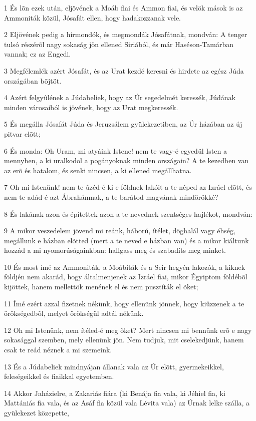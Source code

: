 \par 1 És lõn ezek után, eljövének a Moáb fiai és Ammon fiai, és velök mások is az Ammoniták közül, Jósafát ellen, hogy hadakozzanak vele.
\par 2 Eljövének pedig a hírmondók, és megmondák Jósafátnak, mondván: A tenger tulsó részérõl nagy sokaság jön ellened Siriából, és már Haséson-Tamárban vannak; ez az Engedi.
\par 3 Megfélemlék azért Jósafát, és az Urat kezdé keresni és hirdete az egész Júda országában bõjtöt.
\par 4 Azért felgyûlének a Júdabeliek, hogy az Úr segedelmét keressék, Júdának minden városaiból is jövének, hogy az Urat megkeressék.
\par 5 És megálla Jósafát Júda és Jeruzsálem gyülekezetiben, az Úr házában az új pitvar elõtt;
\par 6 És monda: Oh Uram, mi atyáink Istene! nem te vagy-é egyedül Isten a mennyben, a ki uralkodol a pogányoknak minden országain? A te kezedben van az erõ és hatalom, és senki nincsen, a ki ellened megállhatna.
\par 7 Oh mi Istenünk! nem te ûzéd-é ki e földnek lakóit a te néped az Izráel elõtt, és nem te adád-é azt Ábrahámnak, a te barátod magvának mindörökké?
\par 8 És lakának azon és építettek azon a te nevednek szentséges hajlékot, mondván:
\par 9 A mikor veszedelem jövend mi reánk, háború, ítélet, döghalál vagy éhség, megállunk e házban elõtted (mert a te neved  e házban van) és a mikor kiáltunk hozzád a mi nyomorúságainkban: hallgass meg és szabadíts meg minket.
\par 10 És most ímé az Ammoniták, a Moábiták és a Seir hegyén lakozók, a kiknek földjén nem akarád, hogy általmenjenek az Izráel fiai, mikor Égyiptom földébõl kijöttek, hanem mellettök menének el és nem pusztíták el õket;
\par 11 Ímé ezért azzal fizetnek nékünk, hogy ellenünk jönnek, hogy kiûzzenek a te örökségedbõl, melyet örökségül adtál nékünk.
\par 12 Oh mi Istenünk, nem ítéled-é meg õket? Mert nincsen mi bennünk erõ e nagy sokasággal szemben, mely ellenünk jön. Nem tudjuk, mit cselekedjünk, hanem csak te reád néznek a mi szemeink.
\par 13 És a Júdabeliek mindnyájan állanak vala az Úr elõtt, gyermekeikkel, feleségeikkel és fiaikkal egyetemben.
\par 14 Akkor Jaházielre, a Zakariás fiára (ki Benája fia vala, ki Jéhiel fia, ki Mattániás fia vala, és az Asáf fia közül vala Lévita vala) az Úrnak lelke szálla, a gyülekezet közepette,
